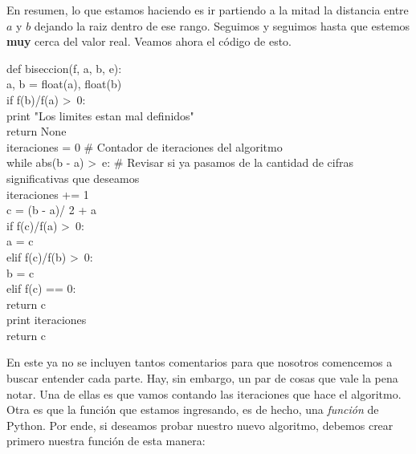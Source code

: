 \documentclass[10pt,letterpaper]{article}
\newenvironment{Code}
{
\begin{lrbox}{\selvestebox}%
\begin{minipage}{\dimexpr\columnwidth-2\fboxsep\relax}
\fontfamily{\ttdefault}\selectfont
}
{\end{minipage}\end{lrbox}%
\begin{center}
\colorbox{light-gray}{\usebox{\selvestebox}}
\end{center}
}
\begin{document}
En resumen, lo que estamos haciendo es ir partiendo a la mitad la distancia entre $a$ y $b$ dejando la raiz dentro de ese rango. Seguimos y seguimos hasta que estemos \textbf{muy} cerca del valor real. Veamos ahora el c\'odigo de esto.

\begin{footnotesize}
\begin{Code}
def biseccion(f, a, b, e):\\
\hspace*{5mm} a,  b = float(a), float(b)\\
\hspace*{5mm} if f(b)/f(a) >\ 0:\\
\hspace*{11mm} print "Los limites estan mal definidos"\\
\hspace*{11mm} return None\\
\hspace*{5mm} iteraciones = 0 \# Contador de iteraciones del algoritmo\\
\hspace*{5mm} while abs(b - a) >\ e: \# Revisar si ya pasamos de la cantidad de cifras significativas que deseamos\\
\hspace*{11mm} iteraciones += 1\\
\hspace*{11mm} c = (b - a)/ 2 + a\\
\hspace*{11mm} if f(c)/f(a) >\ 0:\\
\hspace*{17mm} a = c\\
\hspace*{11mm} elif f(c)/f(b) >\ 0:\\
\hspace*{17mm} b = c\\
\hspace*{11mm} elif f(c) == 0:\\
\hspace*{17mm} return c\\
\hspace*{5mm} print iteraciones\\
\hspace*{5mm} return c
\end{Code}
\end{footnotesize}

En este ya no se incluyen tantos comentarios para que nosotros comencemos a buscar entender cada parte. Hay, sin embargo, un par de cosas que vale la pena notar. Una de ellas es que vamos contando las iteraciones que hace el algoritmo. Otra es que la funci\'on que estamos ingresando, es de hecho, una \emph{funci\'on} de Python. Por ende, si deseamos probar nuestro nuevo algoritmo, debemos crear primero nuestra funci\'on de esta manera:
\end{document}
